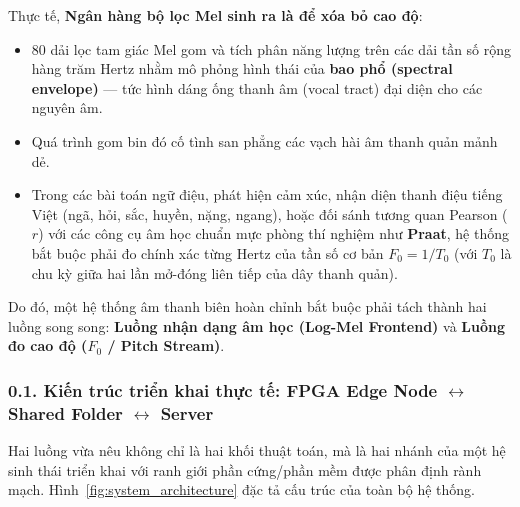 \documentclass[11pt,a4paper]{article}
\begin{document}
Thực tế, \textbf{Ngân hàng bộ lọc Mel sinh ra là để xóa bỏ cao độ}:
\begin{itemize}
    \setlength{\itemsep}{0.5pt}
    \item 80 dải lọc tam giác Mel gom và tích phân năng lượng trên các dải tần số rộng hàng trăm Hertz nhằm mô phỏng hình thái của \textbf{bao phổ (spectral envelope)} --- tức hình dáng ống thanh âm (vocal tract) đại diện cho các nguyên âm.
    \item Quá trình gom bin đó cố tình san phẳng các vạch hài âm thanh quản mảnh dẻ.
    \item Trong các bài toán ngữ điệu, phát hiện cảm xúc, nhận diện thanh điệu tiếng Việt (ngã, hỏi, sắc, huyền, nặng, ngang), hoặc đối sánh tương quan Pearson ($r$) với các công cụ âm học chuẩn mực phòng thí nghiệm như \textbf{Praat}, hệ thống bắt buộc phải đo chính xác từng Hertz của tần số cơ bản $F_0 = 1 / T_0$ (với $T_0$ là chu kỳ giữa hai lần mở-đóng liên tiếp của dây thanh quản).
\end{itemize}

Do đó, một hệ thống âm thanh biên hoàn chỉnh bắt buộc phải tách thành hai luồng song song: \textbf{Luồng nhận dạng âm học (Log-Mel Frontend)} và \textbf{Luồng đo cao độ ($F_0$ / Pitch Stream)}.

\subsubsection*{0.1. Kiến trúc triển khai thực tế: FPGA Edge Node $\leftrightarrow$ Shared Folder $\leftrightarrow$ Server}

Hai luồng vừa nêu không chỉ là hai khối thuật toán, mà là hai nhánh của một hệ sinh thái triển khai với ranh giới phần cứng/phần mềm được phân định rành mạch. Hình~\ref{fig:system_architecture} đặc tả cấu trúc của toàn bộ hệ thống.
\end{document}
